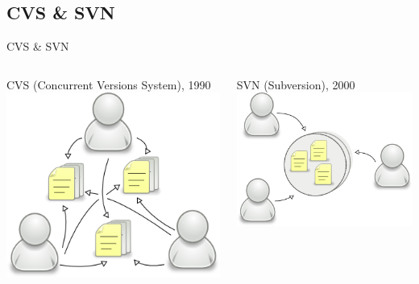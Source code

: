 \subsection{CVS \& SVN}
\begin{frame}{CVS \& SVN}
  \begin{columns}[T]

    \begin{column}{.5\textwidth}
      CVS (Concurrent Versions System), 1990
      \includegraphics[width=\textwidth]{./cvs-model.png}
    \end{column}

    \begin{column}{.5\textwidth}
      SVN (Subversion), 2000
      \includegraphics[width=\textwidth]{./svn-model.png}
    \end{column}

  \end{columns}
\end{frame}

